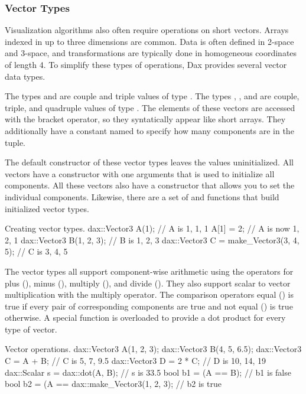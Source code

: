 \subsubsection{Vector Types}

Visualization algorithms also often require operations on short
vectors. Arrays indexed in up to three dimensions are common. Data is often
defined in 2-space and 3-space, and transformations are typically done in
homogeneous coordinates of length 4. To simplify these types of operations,
Dax provides several vector data types.

The types  and  are couple and triple values of type
. The types , , and  are
couple, triple, and quadruple values of type . The elements of
these vectors are accessed with the bracket operator, so they syntatically
appear like short arrays. They additionally have a constant named
 to specify how many
components are in the tuple.

The default constructor of these vector types leaves the values
uninitialized. All vectors have a constructor with one arguments that is
used to initialize all components. All these vectors also have a
constructor that allows you to set the individual components. Likewise,
there are a set of  and  functions that
build initialized vector types.

\begin{daxexample}{Creating vector types.}
dax::Vector3 A(1);                      // A is {1, 1, 1}
A[1] = 2;                               // A is now {1, 2, 1}
dax::Vector3 B(1, 2, 3);                // B is {1, 2, 3}
dax::Vector3 C = make_Vector3(3, 4, 5); // C is {3, 4, 5}
\end{daxexample}

The vector types all support component-wise arithmetic using the operators
for plus (\textcode{+}), minus (\textcode{-}), multiply (\textcode{*}), and
divide (\textcode{/}). They also support scalar to vector multiplication
with the multiply operator. The comparison operators equal (\textcode{==})
is true if every pair of corresponding components are true and not equal
(\textcode{!=}) is true otherwise.  A special  function is
overloaded to provide a dot product for every type of vector.

\begin{daxexample}{Vector operations.}
dax::Vector3 A(1, 2, 3);
dax::Vector3 B(4, 5, 6.5);
dax::Vector3 C = A + B;                     // C is {5, 7, 9.5}
dax::Vector3 D = 2 * C;                     // D is {10, 14, 19}
dax::Scalar s = dax::dot(A, B);             // s is 33.5
bool b1 = (A == B);                         // b1 is false
bool b2 = (A == dax::make_Vector3(1, 2, 3); // b2 is true
\end{daxexample}

